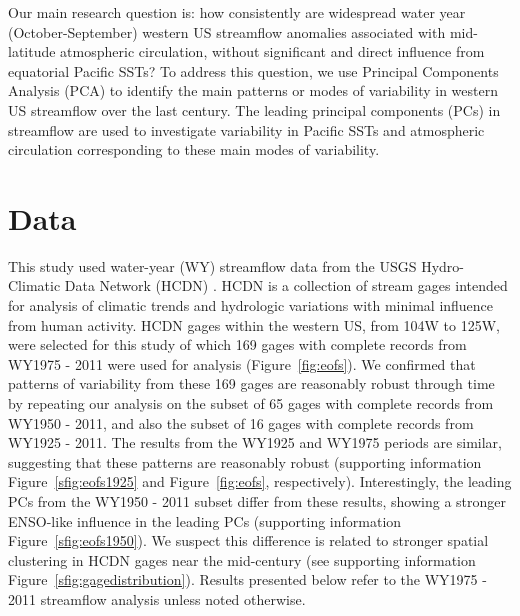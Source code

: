 \documentclass[final, double]{ua-thesis}
\begin{document}
Our main research question is: how consistently are widespread water year (October-September) western US streamflow anomalies associated with mid-latitude atmospheric circulation, without significant and direct influence from equatorial Pacific SSTs? To address this question, we use Principal Components Analysis (PCA) to identify the main patterns or modes of variability in western US streamflow over the last century. The leading principal components (PCs) in streamflow are used to investigate variability in Pacific SSTs and atmospheric circulation corresponding to these main modes of variability. 

\section{Data}

This study used water-year (WY) streamflow data from the USGS Hydro-Climatic Data Network (HCDN) \citep{1lins_usgs_2012}. HCDN is a collection of stream gages intended for analysis of climatic trends and hydrologic variations with minimal influence from human activity. HCDN gages within the western US, from 104\textdegree W to 125\textdegree W, were selected for this study of which  169 gages with complete records from WY1975 - 2011 were used for analysis (Figure~\ref{fig:eofs}). We confirmed that patterns of variability from these 169 gages are reasonably robust through time by repeating our analysis on the subset of 65 gages with complete records from WY1950 - 2011, and also the subset of 16 gages with complete records from WY1925 - 2011. The results from the WY1925 and WY1975 periods are similar, suggesting that these patterns are reasonably robust (supporting information Figure~\ref{sfig:eofs1925} and Figure~\ref{fig:eofs}, respectively). Interestingly, the leading PCs from the WY1950 - 2011 subset differ from these results, showing a stronger ENSO-like influence in the leading PCs (supporting information Figure~\ref{sfig:eofs1950}). We suspect this difference is related to stronger spatial clustering in HCDN gages near the mid-century (see supporting information Figure~\ref{sfig:gagedistribution}). Results presented below refer to the WY1975 - 2011 streamflow analysis unless noted otherwise.
\end{document}
